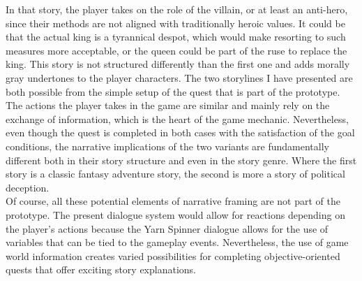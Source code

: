 In that story, the player takes on the role of the villain, or at least an anti-hero, since their methods are not aligned with traditionally heroic values. It could be that the actual king is a tyrannical despot, which would make resorting to such measures more acceptable, or the queen could be part of the ruse to replace the king. This story is not structured differently than the first one and adds morally gray undertones to the player characters. The two storylines I have presented are both possible from the simple setup of the quest that is part of the prototype. The actions the player takes in the game are similar and mainly rely on the exchange of information, which is the heart of the game mechanic. Nevertheless, even though the quest is completed in both cases with the satisfaction of the goal conditions, the narrative implications of the two variants are fundamentally different both in their story structure and even in the story genre. Where the first story is a classic fantasy adventure story, the second is more a story of political deception.\\
Of course, all these potential elements of narrative framing are not part of the prototype. The present dialogue system would allow for reactions depending on the player's actions because the Yarn Spinner dialogue allows for the use of variables that can be tied to the gameplay events. Nevertheless, the use of game world information creates varied possibilities for completing objective-oriented quests that offer exciting story explanations.
